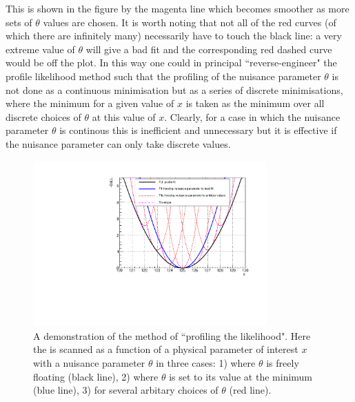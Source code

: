 This is shown in the figure by the magenta line which becomes smoother as more sets of $\theta$ values are chosen. It is worth noting that not all of the red curves (of which there are infinitely many) necessarily have to touch the black line: a very extreme value of $\theta$ will give a bad fit and the corresponding red dashed curve would be off the plot. In this way one could in principal ``reverse-engineer" the profile likelihood method such that the profiling of the nuisance parameter $\theta$ is not done as a continuous minimisation but as a series of discrete minimisations, where the minimum \NLL for a given value of $x$ is taken as the minimum \NLL over all discrete choices of $\theta$ at this value of $x$. Clearly, for a case in which the nuisance parameter $\theta$ is continous this is inefficient and unnecessary but it is effective if the nuisance parameter can only take discrete values.

\begin{figure}
\begin{center}
  \includegraphics[width=0.8\textwidth]{ch5_anal_and_results/plots/envelope_explain.pdf}
  \caption{A demonstration of the method of ``profiling the likelihood". Here the \NLL is scanned as a function of a physical parameter of interest $x$ with a nuisance parameter $\theta$ in three cases: 1) where $\theta$ is freely floating (black line), 2) where $\theta$ is set to its value at the \NLL minimum (blue line), 3) for several arbitary choices of $\theta$ (red line).}
  \label{fig:envelope_explain1}
\end{center}
\end{figure}

